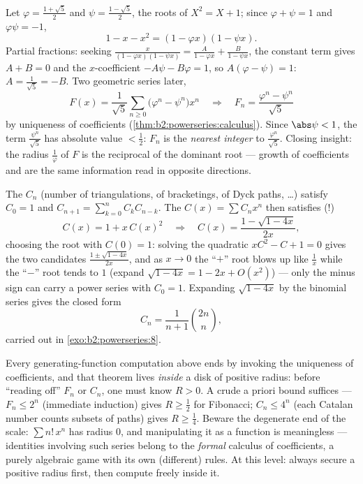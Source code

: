 \begin{example}\label{ex:b2:powerseries:binet}
Let $\varphi = \frac{1+\sqrt5}{2}$ and $\psi =
\frac{1-\sqrt5}{2}$, the roots of $X^2 = X + 1$; since $\varphi
+ \psi = 1$ and $\varphi\psi = -1$,
\[
1 - x - x^2 = (1 - \varphi x)(1 - \psi x) .
\]
Partial fractions: seeking $\frac{x}{(1-\varphi x)(1-\psi x)} =
\frac{A}{1 - \varphi x} + \frac{B}{1 - \psi x}$, the constant
term gives $A + B = 0$ and the $x$-coefficient $-A\psi - B\varphi
= 1$, so $A(\varphi - \psi) = 1$: $A = \frac{1}{\sqrt5} = -B$.
Two geometric series later,
\[
F(x) = \frac{1}{\sqrt5}\sum_{n\geq0}
\bigl(\varphi^n - \psi^n\bigr)x^n
\quad\Longrightarrow\quad
F_n = \frac{\varphi^n - \psi^n}{\sqrt5}
\]
by uniqueness of coefficients
(\cref{thm:b2:powerseries:calculus}). Since $\abs\psi < 1$, the
term $\frac{\psi^n}{\sqrt5}$ has absolute value $< \frac12$:
$F_n$ is the \emph{nearest integer} to
$\frac{\varphi^n}{\sqrt5}$. Closing insight: the radius
$\frac1\varphi$ of $F$ is the reciprocal of the dominant root
--- growth of coefficients and  are the
same information read in opposite directions.
\end{example}

\begin{example}\label{ex:b2:powerseries:catalan}
The  $C_n$ (number of triangulations, of bracketings,
of Dyck paths, \dots) satisfy $C_0 = 1$ and $C_{n+1} = \sum_{k=0}^n
C_kC_{n-k}$. The  $C(x) = \sum C_nx^n$ then
satisfies (!)
\[
C(x) = 1 + x\,C(x)^2
\quad\Longrightarrow\quad
C(x) = \frac{1 - \sqrt{1 - 4x}}{2x} ,
\]
choosing the root with $C(0) = 1$: solving the quadratic
$xC^2 - C + 1 = 0$ gives the two candidates $\frac{1 \pm
\sqrt{1-4x}}{2x}$, and as $x \to 0$ the ``$+$'' root blows up
like $\frac1x$ while the ``$-$'' root tends to $1$ (expand
$\sqrt{1-4x} = 1 - 2x + O(x^2)$) --- only the minus sign can
carry a power series with $C_0 = 1$. Expanding $\sqrt{1 - 4x}$ by the
binomial series gives the closed form
\[
C_n = \frac{1}{n+1}\binom{2n}{n} ,
\]
carried out in \cref{exo:b2:powerseries:8}.
\end{example}

\begin{remark}
Every generating-function computation above ends by invoking
the uniqueness of coefficients, and that theorem lives
\emph{inside} a disk of positive radius: before ``reading off''
$F_n$ or $C_n$, one must know $R > 0$. A crude a priori bound
suffices --- $F_n \leq 2^n$ (immediate induction) gives $R \geq
\frac12$ for Fibonacci; $C_n \leq 4^n$ (each Catalan number
counts subsets of paths) gives $R \geq \frac14$. Beware the
degenerate end of the scale: $\sum n!\,x^n$ has radius $0$, and
manipulating it as a function is meaningless --- identities
involving such series belong to the \emph{formal} calculus of
coefficients, a purely algebraic game with its own (different)
rules. At this level: always secure a positive radius first,
then compute freely inside it.
\end{remark}

